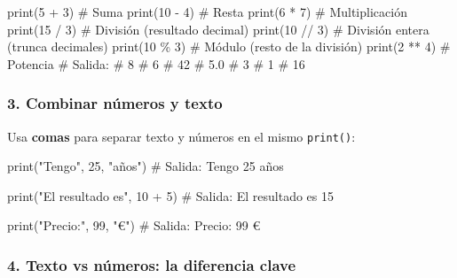 \documentclass[
  doc,
  floatsintext,
  longtable,
  a4paper,
  nolmodern,
  notxfonts,
  notimes,
  12pt,
  colorlinks=true,linkcolor=blue,citecolor=blue,urlcolor=blue]{apa7}
\newenvironment{Shaded}{\begin{snugshade}}{\end{snugshade}}
\newcommand{\BuiltInTok}[1]{\textcolor[rgb]{0.00,0.23,0.31}{#1}}
\newcommand{\CommentTok}[1]{\textcolor[rgb]{0.37,0.37,0.37}{#1}}
\newcommand{\DecValTok}[1]{\textcolor[rgb]{0.68,0.00,0.00}{#1}}
\newcommand{\NormalTok}[1]{\textcolor[rgb]{0.00,0.23,0.31}{#1}}
\newcommand{\OperatorTok}[1]{\textcolor[rgb]{0.37,0.37,0.37}{#1}}
\newcommand{\StringTok}[1]{\textcolor[rgb]{0.13,0.47,0.30}{#1}}
\begin{document}
\begin{Shaded}
\begin{Highlighting}[]
\BuiltInTok{print}\NormalTok{(}\DecValTok{5} \OperatorTok{+} \DecValTok{3}\NormalTok{)      }\CommentTok{\# Suma}
\BuiltInTok{print}\NormalTok{(}\DecValTok{10} \OperatorTok{{-}} \DecValTok{4}\NormalTok{)     }\CommentTok{\# Resta}
\BuiltInTok{print}\NormalTok{(}\DecValTok{6} \OperatorTok{*} \DecValTok{7}\NormalTok{)      }\CommentTok{\# Multiplicación}
\BuiltInTok{print}\NormalTok{(}\DecValTok{15} \OperatorTok{/} \DecValTok{3}\NormalTok{)     }\CommentTok{\# División (resultado decimal)}
\BuiltInTok{print}\NormalTok{(}\DecValTok{10} \OperatorTok{//} \DecValTok{3}\NormalTok{)    }\CommentTok{\# División entera (trunca decimales)}
\BuiltInTok{print}\NormalTok{(}\DecValTok{10} \OperatorTok{\%} \DecValTok{3}\NormalTok{)     }\CommentTok{\# Módulo (resto de la división)}
\BuiltInTok{print}\NormalTok{(}\DecValTok{2} \OperatorTok{**} \DecValTok{4}\NormalTok{)     }\CommentTok{\# Potencia}
\CommentTok{\# Salida:}
\CommentTok{\# 8}
\CommentTok{\# 6}
\CommentTok{\# 42}
\CommentTok{\# 5.0}
\CommentTok{\# 3}
\CommentTok{\# 1}
\CommentTok{\# 16}
\end{Highlighting}
\end{Shaded}

\subsubsection{3. Combinar números y
texto}\label{combinar-nuxfameros-y-texto}

Usa \textbf{comas} para separar texto y números en el mismo
\texttt{print()}:

\begin{Shaded}
\begin{Highlighting}[]
\BuiltInTok{print}\NormalTok{(}\StringTok{"Tengo"}\NormalTok{, }\DecValTok{25}\NormalTok{, }\StringTok{"años"}\NormalTok{)}
\CommentTok{\# Salida: Tengo 25 años}

\BuiltInTok{print}\NormalTok{(}\StringTok{"El resultado es"}\NormalTok{, }\DecValTok{10} \OperatorTok{+} \DecValTok{5}\NormalTok{)}
\CommentTok{\# Salida: El resultado es 15}

\BuiltInTok{print}\NormalTok{(}\StringTok{"Precio:"}\NormalTok{, }\DecValTok{99}\NormalTok{, }\StringTok{"€"}\NormalTok{)}
\CommentTok{\# Salida: Precio: 99 €}
\end{Highlighting}
\end{Shaded}

\subsubsection{4. Texto vs números: la diferencia
clave}\label{texto-vs-nuxfameros-la-diferencia-clave}
\end{document}
